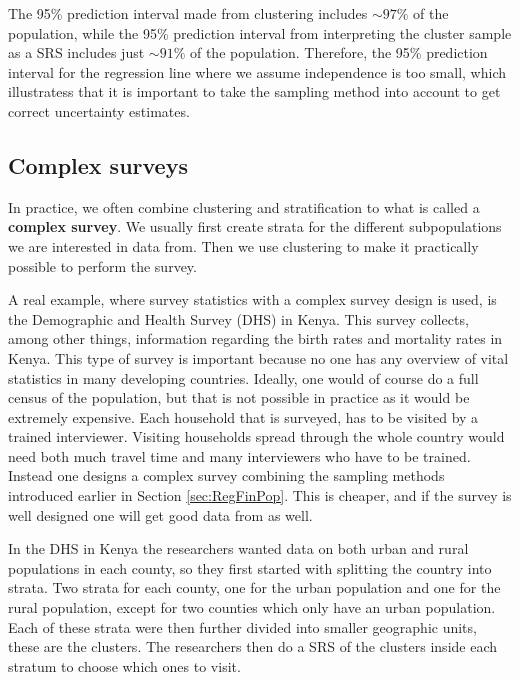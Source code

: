 \documentclass{article}
\begin{document}
\begin{example}
  The 95\% prediction interval made from clustering includes \(\sim 97\%\) of the
  population, while the 95\% prediction interval from interpreting the cluster
  sample as a SRS includes just \(\sim 91\%\) of the population. Therefore, the 95\%
  prediction interval for the regression line where we assume independence is
  too small, which illustratess that it
  is important to take the sampling method into account to get correct
  uncertainty estimates.

  
\end{example}

\subsection{Complex surveys} \label{sec:complexSurveys}

In practice, we often combine clustering and stratification to what is called a
\textbf{complex survey}. We usually first create strata for the different subpopulations
we are interested in data from. Then we use clustering to make it
practically possible to perform the survey.

A real example, where survey statistics with a complex survey design is used, is the Demographic and Health
Survey (DHS) in Kenya. This survey collects, among other things, 
information regarding the birth rates and mortality rates in Kenya. This type of
survey is important because no one has any overview of vital statistics in
many developing countries.
Ideally, one would of course do a full census of the population, but that is not
possible in practice as it would be extremely expensive. Each household that is
surveyed, has to be visited by a trained interviewer. Visiting
households spread through the whole country would need both much travel time and
many interviewers who have to be trained. Instead one designs a
complex survey combining the sampling methods introduced earlier in Section
\ref{sec:RegFinPop}. This is cheaper, and if the survey is well designed
one will get good data from as well.

In the DHS in Kenya the researchers wanted data on both urban and rural
populations in each county, so they first started with splitting the country into
strata. Two strata for each county, one for the urban population and one for the
rural population, except for two counties which only have an urban population.
Each of these strata were then further divided into smaller geographic units,
these are the clusters. The researchers then do a SRS of the clusters inside
each stratum to choose which ones to visit. \cite{DHS}
\end{document}
